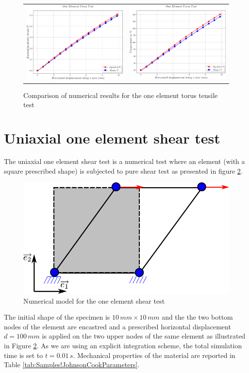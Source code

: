 \begin{figure}[h]
\begin{centering}
\begin{tabular}{cc}
\includegraphics[width=0.45\columnwidth]{Figures/Samples/Element/Torus_plasticStrain} & \includegraphics[width=0.45\columnwidth]{Figures/Samples/Element/Torus_temperature}\tabularnewline
\end{tabular}
\par\end{centering}
\caption{Comparison of numerical results for the one element torus tensile
test\label{fig:Samples!Single!Torus-Comparison}}
\end{figure}
\clearpage

\section{Uniaxial one element shear test}

The uniaxial one element shear test is a numerical test where an element
(with a square prescribed shape) is subjected to pure shear test as
presented in figure \ref{fig:Samples!Single!Shear}.
\begin{figure}[h]
\begin{centering}
\includegraphics[width=0.5\columnwidth]{Figures/SamplesSingleShear}
\par\end{centering}
\caption{Numerical model for the one element shear test\label{fig:Samples!Single!Shear}}
\end{figure}
 The initial shape of the specimen is $10\,mm\times10\,mm$ and the
the two bottom nodes of the element are encastred and a prescribed
horizontal displacement $d=100\,mm$ is applied on the two upper nodes
of the same element as illustrated in Figure \ref{fig:Samples!Single!Shear}.
As we are using an explicit integration scheme, the total simulation
time is set to $t=0.01\,s$. Mechanical properties of the material
are reported in Table \ref{tab:Samples!JohnsonCookParameters}. 

